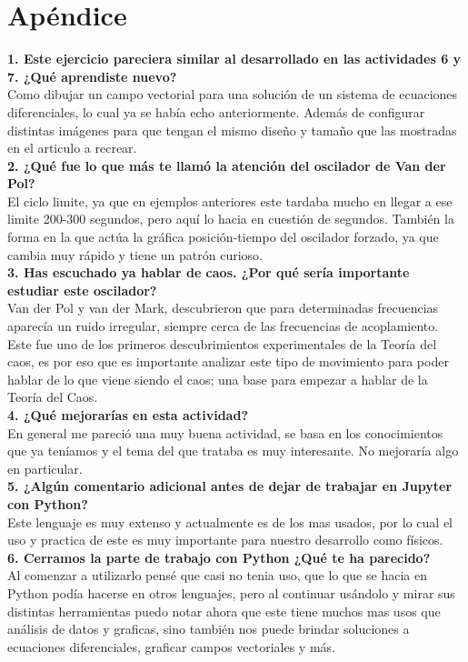 \documentclass[12pt]{article}
\begin{document}
\section{Apéndice}
\noindent\textbf {1. Este ejercicio pareciera similar al desarrollado en las actividades 6 y 7. ¿Qué aprendiste nuevo?} \\

Como dibujar un campo vectorial para una solución de un sistema de ecuaciones diferenciales, lo cual ya se había echo anteriormente. Además de configurar distintas imágenes para que tengan el mismo diseño y tamaño que las mostradas en el articulo a recrear. \\

\noindent\textbf {2. ¿Qué fue lo que más te llamó la atención del oscilador de Van der Pol?} \\

El ciclo limite, ya que en ejemplos anteriores  este tardaba mucho en llegar a ese limite 200-300 segundos, pero aquí lo hacia en cuestión de segundos. También la forma en la que actúa la gráfica posición-tiempo del oscilador forzado, ya que cambia muy rápido y tiene un patrón curioso. \\

\noindent\textbf {3. Has escuchado ya hablar de caos. ¿Por qué sería importante estudiar este oscilador?} \\

Van der Pol y van der Mark, descubrieron que para determinadas frecuencias aparecía un ruido irregular, siempre cerca de las frecuencias de acoplamiento. Este fue uno de los primeros descubrimientos experimentales de la Teoría del caos, es por eso que es importante analizar este tipo de movimiento para poder hablar de lo que viene siendo el caos; una base para empezar a hablar de la Teoría del Caos. \\

\noindent\textbf {4. ¿Qué mejorarías en esta actividad?} \\

En general me pareció una muy buena actividad, se basa en los conocimientos que ya teníamos y el tema del que trataba es muy interesante. No mejoraría algo en particular. \\

\noindent\textbf {5. ¿Algún comentario adicional antes de dejar de trabajar en Jupyter con Python?} \\

Este lenguaje es muy extenso y actualmente es de los mas usados, por lo cual el uso y practica de este es muy importante para nuestro desarrollo como físicos. \\

\noindent\textbf {6. Cerramos la parte de trabajo con Python ¿Qué te ha parecido?} \\

Al comenzar a utilizarlo pensé que casi no tenia uso, que lo que se hacia en Python podía hacerse en otros lenguajes, pero al continuar usándolo y mirar sus distintas herramientas puedo notar ahora que este tiene muchos mas usos que análisis de datos y graficas, sino también nos puede brindar soluciones a ecuaciones diferenciales, graficar campos vectoriales y más.
\end{document}
